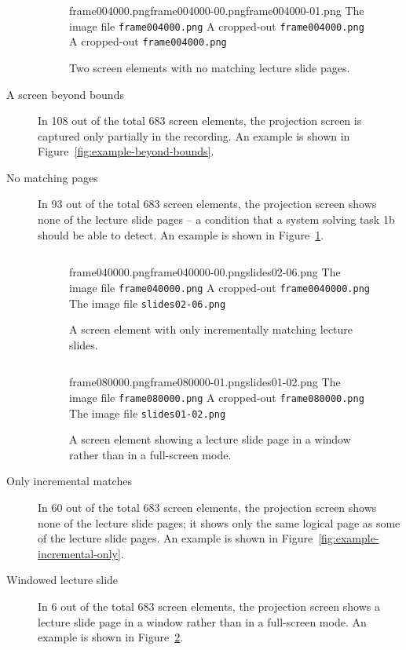 \begin{description}
\begin{figure}
    \kern\floatsep
    \inputminted{xml}{fig/examples/no-keyrefs/example.xml}\par
      {frame004000.png}{frame004000-00.png}{frame004000-01.png}%
      {The image file \texttt{frame004000.png}}%
      {A cropped-out \texttt{frame004000.png}}%
      {A cropped-out \texttt{frame004000.png}}
    \caption{Two screen elements with no matching lecture slide pages.}
    \label{fig:example-no-keyrefs}
  \end{figure}
  \item[A screen beyond bounds] In 108 out of the total 683 screen elements,
    the projection screen is captured only partially in the recording.
    An example is shown in Figure~\ref{fig:example-beyond-bounds}.
  \item[No matching pages] In 93 out of the total 683 screen elements, the
    projection screen shows none of the lecture slide pages – a condition
    that a system solving task 1b should be able to detect.
    An example is shown in Figure~\ref{fig:example-no-keyrefs}.

  \begin{figure}
    \inputminted{xml}{fig/examples/incremental-only/example.xml}\par
      {frame040000.png}{frame040000-00.png}{slides02-06.png}%
      {The image file \texttt{frame040000.png}}%
      {A cropped-out \texttt{frame0040000.png}}%
      {The image file \texttt{slides02-06.png}}
    \caption{A screen element with only incrementally matching lecture slides.}
    \label{fig:example-incremental-only}

    \kern\floatsep
    \inputminted{xml}{fig/examples/windowed/example.xml}\par
      {frame080000.png}{frame080000-01.png}{slides01-02.png}%
      {The image file \texttt{frame080000.png}}%
      {A cropped-out \texttt{frame080000.png}}%
      {The image file \texttt{slides01-02.png}}
    \caption{A screen element showing a lecture slide page in a window rather
      than in a full-screen mode.}
    \label{fig:example-windowed}
  \end{figure}
  \item[Only incremental matches] In 60 out of the total 683 screen elements,
    the projection screen shows none of the lecture slide pages; it shows only
    the same logical page as some of the lecture slide pages.
    An example is shown in Figure~\ref{fig:example-incremental-only}.
  \item[Windowed lecture slide] In 6 out of the total 683 screen elements,
    the projection screen shows a lecture slide page in a window rather than
    in a full-screen mode. An example is shown in
    Figure~\ref{fig:example-windowed}.


\end{description}
